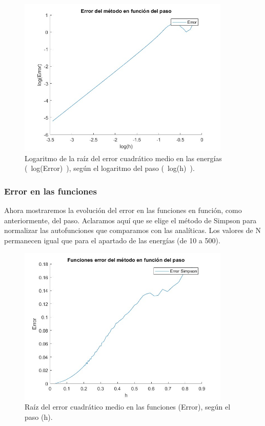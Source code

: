 \documentclass[12pt]{article}
\begin{document}
    \begin{figure}[H]
        \centering
        \includegraphics[width=0.9\textwidth]{errorpaso500Nlog.jpg}
        \caption{Logaritmo de la raíz del error cuadrático medio en las energías (~log(Error)~), según el  logaritmo del paso (~log(h)~).}
        \end{figure}

     \subsubsection{Error en las funciones}

    Ahora mostraremos la evolución del error en las funciones en función, como anteriormente, del paso. Aclaramos aquí que se elige el método de Simpson para normalizar las autofunciones que comparamos con las analíticas. Los valores de N permanecen igual que para el apartado de las energías (de 10 a 500).
        
    \begin{figure}[H]
        \centering
        \includegraphics[width=0.9\textwidth]{errorfuncionsegunpaso500N.jpg}
        \caption{Raíz del error cuadrático medio en las funciones (Error), según el paso (h).}
        \end{figure} 
        
\end{document}
